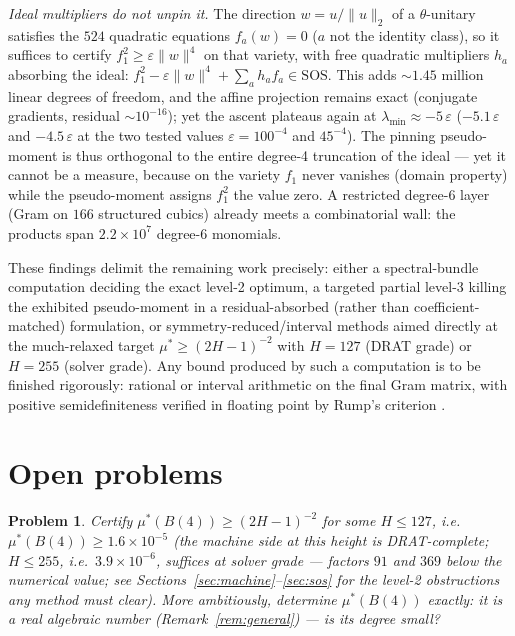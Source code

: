 \documentclass[11pt]{article}
\newtheorem{problem}[theorem]{Problem}
\begin{document}
\emph{Ideal multipliers do not unpin it.}  The direction $w=u/\|u\|_2$
of a $\theta$-unitary satisfies the $524$ quadratic equations
$f_a(w)=0$ ($a$ not the identity class), so it suffices to certify
$f_1^2\ge\varepsilon\|w\|^4$ on that variety, with free quadratic
multipliers $h_a$ absorbing the ideal:
$f_1^2-\varepsilon\|w\|^4+\sum_a h_af_a\in\mathrm{SOS}$.  This adds
$\sim1.45$ million linear degrees of freedom, and the affine
projection remains exact (conjugate gradients, residual
$\sim10^{-16}$); yet the ascent plateaus again at
$\lambda_{\min}\approx-5\,\varepsilon$ ($-5.1\,\varepsilon$ and
$-4.5\,\varepsilon$ at the two tested values
$\varepsilon=100^{-4}$ and $45^{-4}$).  The pinning pseudo-moment is thus
orthogonal to the entire degree-4 truncation of the ideal --- yet it
cannot be a measure, because on the variety $f_1$ never vanishes
(domain property) while the pseudo-moment assigns $f_1^2$ the value
zero.  A restricted degree-6 layer (Gram on $166$ structured cubics)
already meets a combinatorial wall: the products span $2.2\times10^7$
degree-6 monomials.

These findings delimit the remaining work precisely: either a
spectral-bundle computation deciding the exact level-2 optimum, a
targeted partial level-3 killing the exhibited pseudo-moment in a
residual-absorbed (rather than coefficient-matched) formulation, or
symmetry-reduced/interval methods aimed directly at the much-relaxed
target $\mu^*\ge(2H-1)^{-2}$ with $H=127$ (DRAT grade) or $H=255$
(solver grade).  Any bound produced by such a computation is to be
finished rigorously: rational or interval arithmetic on the final Gram
matrix, with positive semidefiniteness verified in floating point by
Rump's criterion \cite{Rump2006}.

\section{Open problems}\label{sec:problems}

\begin{problem}\label{prob:cert}
Certify $\mu^*(B(4))\ge(2H-1)^{-2}$ for some $H\le 127$, i.e.\
$\mu^*(B(4))\ge 1.6\times10^{-5}$ (the machine side at this height is
DRAT-complete; $H\le 255$, i.e.\ $3.9\times10^{-6}$, suffices at
solver grade --- factors $91$ and $369$ below the numerical value; see
Sections~\ref{sec:machine}--\ref{sec:sos} for the level-2 obstructions
any method must clear).  More ambitiously, determine $\mu^*(B(4))$
exactly: it is a real algebraic number (Remark~\ref{rem:general}) ---
is its degree small?
\end{problem}
\end{document}
